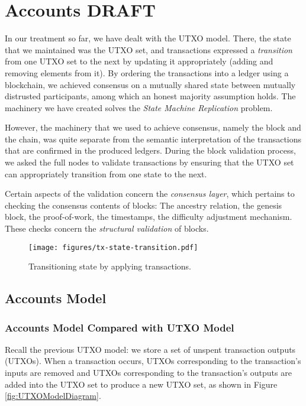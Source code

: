 \chapter{Accounts \small{\textsf{DRAFT}}}\label{chapter:accounts}

In our treatment so far, we have dealt with the UTXO model. There, the state
that we maintained was the UTXO set, and transactions expressed a \emph{transition}
from one UTXO set to the next by updating it appropriately (adding and removing elements from
it). By ordering the transactions into a ledger using a blockchain, we achieved
consensus on a mutually shared state between mutually distrusted participants, among
which an honest majority assumption holds. The machinery
we have created solves the \emph{State Machine Replication}
problem.

However, the machinery that we used to achieve consensus, namely the block and the chain,
was quite separate from the semantic interpretation of the transactions that are confirmed
in the produced ledgers. During the block validation process, we asked the full nodes
to validate transactions by ensuring that the UTXO set can appropriately transition
from one state to the next.

Certain aspects of the validation concern the \emph{consensus layer},
which pertains to checking the consensus contents of blocks: The ancestry relation,
the genesis block, the proof-of-work, the timestamps, the difficulty adjustment mechanism.
These checks concern the \emph{structural validation} of blocks. 

\begin{figure}[h]
  \centering
  \texttt{[image: figures/tx-state-transition.pdf]}
  \caption{Transitioning state by applying transactions.}
  \label{fig.state-transition}
\end{figure}

\section{Accounts Model}

\subsection{Accounts Model Compared with UTXO Model}
Recall the previous UTXO model: we store a set of unspent transaction outputs (UTXOs). When a transaction occurs, UTXOs corresponding to the transaction's inputs are removed and UTXOs corresponding to the transaction's outputs are added into the UTXO set to produce a new UTXO set, as shown in Figure \ref{fig:UTXOModelDiagram}.

